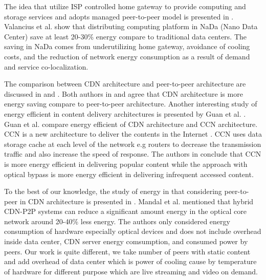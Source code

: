 The idea that utilize ISP controlled home gateway to provide computing and storage services and adopts managed peer-to-peer model is presented in \cite{valancius2009greening}. 
Valancius et al. \cite{valancius2009greening} show that distributing computing platform in NaDa (Nano Data Center) save at least 20-30\% energy compare to traditional data centers.
The saving in NaDa comes from underutilizing home gateway, avoidance of cooling costs, and the reduction of network energy consumption as a result of demand and service co-localization.

The comparison between CDN architecture and peer-to-peer architecture are discussed in \cite{baliga2007energy} and \cite{feldmann2010energy}.
Both authors in \cite{baliga2007energy} and \cite{feldmann2010energy} agree that CDN architecture is more energy saving compare to peer-to-peer architecture. 
Another interesting study of energy efficient in content delivery architectures is presented by Guan et al. \cite{5963557}.
Guan et al. \cite{5963557} compare energy efficient of CDN architecture and CCN architecture.
CCN is a new architecture to deliver the contents in the Internet \cite{Jacobson:2009:NNC:1658939.1658941}.  
CCN uses data storage cache at each level of the network e.g routers to decrease the transmission traffic and also increase the speed of response.
The authors in \cite{5963557} conclude that CCN is more energy efficient in delivering popular content while the approach with optical bypass is more energy efficient in delivering infrequent accessed content.

To the best of our knowledge, the study of energy in that considering peer-to-peer in CDN architecture is presented in \cite{6524219}.
Mandal et al. \cite{6524219} mentioned that hybrid CDN-P2P systems can reduce a significant amount energy in the optical core network around 20-40\% less energy.  
The authors only considered energy consumption of hardware especially optical devices and does not include overhead inside data center, CDN server energy comsumption, and consumed power by peers.
Our work is quite different, we take number of peers with static content and add overhead of data center which is  power of cooling cause by temperature of hardware for different purpose which are live streaming and video on demand.



